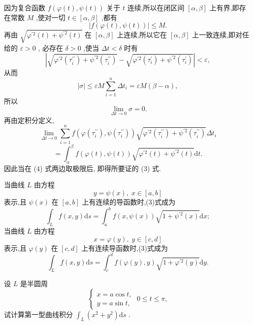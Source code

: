 因为复合函数 \(f\left( {\varphi \left( t\right) ,\psi \left( t\right) }\right)\) 关于 \(t\) 连续,所以在闭区间 \(\left\lbrack  {\alpha ,\beta }\right\rbrack\) 上有界,即存在常数 \(M\) ,使对一切 \(t \in  \left\lbrack  {\alpha ,\beta }\right\rbrack\) ,都有
\[
\left| {f\left( {\varphi \left( t\right) ,\psi \left( t\right) }\right) }\right|  \leq  M.
\]
再由 \(\sqrt{{\varphi }^{\prime 2}\left( t\right)  + {\psi }^{\prime 2}\left( t\right) }\) 在 \(\left\lbrack  {\alpha ,\beta }\right\rbrack\) 上连续,所以它在 \(\left\lbrack  {\alpha ,\beta }\right\rbrack\) 上一致连续,即对任给的 \(\varepsilon  > 0\) , 必存在 \(\delta  > 0\) ,使当 \({\Delta t} < \delta\) 时有
\[
\left| {\sqrt{{\varphi }^{\prime 2}\left( {\tau }_{i}^{\prime \prime }\right)  + {\psi }^{\prime 2}\left( {\tau }_{i}^{\prime \prime }\right) } - \sqrt{{\varphi }^{\prime 2}\left( {\tau }_{i}^{\prime }\right)  + {\psi }^{\prime 2}\left( {\tau }_{i}^{\prime }\right) }}\right|  < \varepsilon ,
\]
从而
\[
\left| \sigma \right|  \leq  {\varepsilon M}\mathop{\sum }\limits_{{i = 1}}^{n}\Delta {t}_{i} = {\varepsilon M}\left( {\beta  - \alpha }\right) ,
\]
所以
\[
\mathop{\lim }\limits_{{{\Delta t} \rightarrow  0}}\sigma  = 0.
\]
再由定积分定义,
\[
\mathop{\lim }\limits_{{{\Delta t} \rightarrow  0}}\mathop{\sum }\limits_{{i = 1}}^{n}f\left( {\varphi \left( {\tau }_{i}^{\prime \prime }\right) ,\psi \left( {\tau }_{i}^{\prime \prime }\right) }\right) \sqrt{{\varphi }^{\prime 2}\left( {\tau }_{i}^{\prime \prime }\right)  + {\psi }^{\prime 2}\left( {\tau }_{i}^{\prime \prime }\right) }\Delta {t}_{i}
\]
\[
= {\int }_{\alpha }^{\beta }f\left( {\varphi \left( t\right) ,\psi \left( t\right) }\right) \sqrt{{\varphi }^{\prime 2}\left( t\right)  + {\psi }^{\prime 2}\left( t\right) }\mathrm{d}t.
\]
因此当在 (4) 式两边取极限后, 即得所要证的 (3) 式.

当曲线 \(L\) 由方程
\[
y = \psi \left( x\right) ,\;x \in  \left\lbrack  {a,b}\right\rbrack
\]
表示,且 \(\psi \left( x\right)\) 在 \(\left\lbrack  {a,b}\right\rbrack\) 上有连续的导函数时,(3)式成为
\[
{\int }_{L}f\left( {x,y}\right) \mathrm{d}s = {\int }_{a}^{b}f\left( {x,\psi \left( x\right) }\right) \sqrt{1 + {\psi }^{\prime 2}\left( x\right) }\mathrm{d}x; \tag{5}
\]
当曲线 \(L\) 由方程
\[
x = \varphi \left( y\right) ,\;y \in  \left\lbrack  {c,d}\right\rbrack
\]
表示,且 \(\varphi \left( y\right)\) 在 \(\left\lbrack  {c,d}\right\rbrack\) 上有连续导函数时,(3)式成为
\[
{\int }_{L}f\left( {x,y}\right) \mathrm{d}s = {\int }_{c}^{d}f\left( {\varphi \left( y\right) ,y}\right) \sqrt{1 + {\varphi }^{\prime 2}\left( y\right) }\mathrm{d}y. \tag{6}
\]
\begin{example}

\end{example}
设 \(L\) 是半圆周
\[
\left\{  {\begin{array}{l} x = a\cos t, \\  y = a\sin t, \end{array}\;0 \leq  t \leq  \pi ,}\right.
\]
试计算第一型曲线积分 \({\int }_{L}\left( {{x}^{2} + {y}^{2}}\right) \mathrm{d}s\) .

